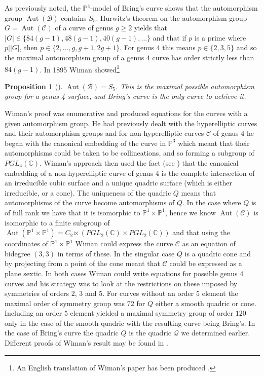 \documentclass{amsart}
\newtheorem{prop}[theorem]{Proposition}
\DeclareMathOperator{\Aut}{Aut}
\begin{document}
As previously noted, the $\mathbb{P}^4$-model of Bring's curve shows that the automorphism group $\Aut(\mathcal{B})$ contains $S_5$. Hurwitz's theorem on the automorphism group $G=\Aut(\mathcal{C})$ of a curve of genus $g\ge2$ yields that
$|G|\in\{84(g-1), 48(g-1), 40(g-1),\ldots \}$ and that if $p$ is a prime where $p\big| |G|$, then $p\in\{2,\ldots,g, g+1,2g+1\}$.
For genus $4$ this means $p\in\{2,3,5\}$ and so the maximal automorphism group of a genus $4$ curve has order strictly less than $84(g-1)$. In 1895 Wiman showed\footnote{An English translation of Wiman's paper has been produced \cite{DisneyHogg2022}.}

\begin{prop}[\cite{Wiman1895}]
$\Aut(\mathcal{B}) = S_5$. This is the maximal possible automorphism group for a genus-4 surface, and Bring's curve is the only curve to achieve it.
\end{prop}

Wiman's proof was enumerative and produced equations for the curves with a given automorphism group. He had previously dealt with the hyperelliptic curves and their automorphism groups and for non-hyperelliptic curves $\mathcal{C}$ of genus 4 he began with the canonical embedding of the curve in $\mathbb{P}^3$ which meant that their automorphisms could be taken to be collineations, and so forming a subgroup of $PGL_4(\mathbb{C})$. Wiman's approach then used the fact (see \cite[IV.5.2.2]{Hartshorne1977}) that the canonical embedding of a non-hyperelliptic curve of genus 4 is the complete intersection of an irreducible cubic surface and a unique quadric surface (which is either irreducible, or a cone). The uniqueness of the quadric $Q$ means that automorphisms of the curve become automorphisms of $Q$. In the case where $Q$ is of full rank we have that it is isomorphic to $\mathbb{P}^1 \times \mathbb{P}^1$, hence we know $\Aut(\mathcal{C})$ is isomorphic to a finite subgroup of $\Aut(\mathbb{P}^1 \times \mathbb{P}^1) = C_2 \ltimes (PGL_2(\mathbb{C}) \times PGL_2(\mathbb{C}))$ and that using the coordinates of $\mathbb{P}^1 \times \mathbb{P}^1$ Wiman could express the curve $\mathcal{C}$ as an equation of bidegree $(3,3)$ in terms of these. In the singular case $Q$ is a quadric cone and by projecting from a point of the cone meant that $\mathcal{C}$ could be expressed as a plane sextic. In both cases Wiman could write equations for possible genus $4$ curves and his strategy was to look at the restrictions on these imposed by symmetries of orders $2$, $3$ and $5$. For curves without an order $5$ element the maximal order of symmetry group was $72$ for $Q$ either a smooth quadric or cone. Including an order $5$ element yielded a maximal symmetry group of order $120$ only in the case of the smooth quadric with the resulting curve being Bring's. In the case of Bring's curve the quadric $Q$ is the quadric $\mathcal{Q}$ we determined earlier. Different proofs of Wiman's result may be found in \cite{Kuribayashi1990,Magaard2002}.
\end{document}
